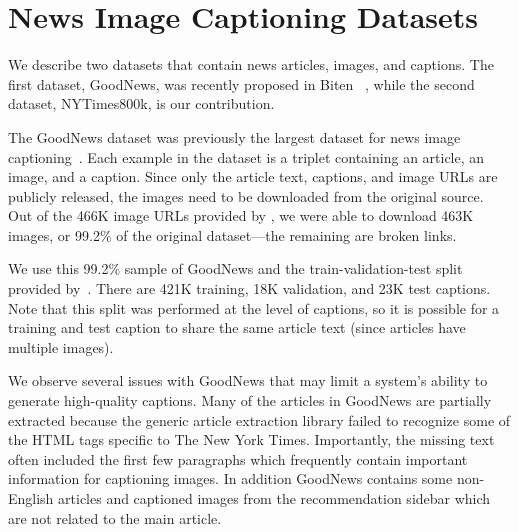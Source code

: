 


\section{News Image Captioning Datasets}
\label{sec:dataset}
We describe two datasets that contain news articles, images, and captions. The
first dataset, GoodNews, was recently proposed in Biten
\etal~\cite{Biten2019GoodNews}, while the
second dataset, NYTimes800k, is our contribution.


The GoodNews dataset was previously the largest dataset for news image
captioning~\cite{Biten2019GoodNews}. Each example in the dataset is a triplet
containing an article, an image, and a caption. Since only the article text,
captions, and image URLs are publicly released, the images need to be
downloaded from the original source. Out of the 466K image URLs provided by
\cite{Biten2019GoodNews}, we were able to download 463K images, or 99.2\% of
the original dataset---the remaining are broken links.

We use this 99.2\% sample of GoodNews and the train-validation-test split
provided by~\cite{Biten2019GoodNews}. There are 421K training, 18K validation,
and 23K test captions. Note that this split was performed at the level of
captions, so it is possible for a training and test caption to share the same
article text (since articles have multiple images).

We observe several issues with GoodNews that may limit a system's
ability to generate high-quality captions. Many of the articles in GoodNews are
partially extracted because the generic article extraction library
failed to recognize some of the HTML tags specific to The New York Times.
Importantly, the missing text often included the first few paragraphs which
frequently contain important information for captioning images. In addition
GoodNews contains some non-English articles and captioned images from the
recommendation sidebar which are not related to the main article.


